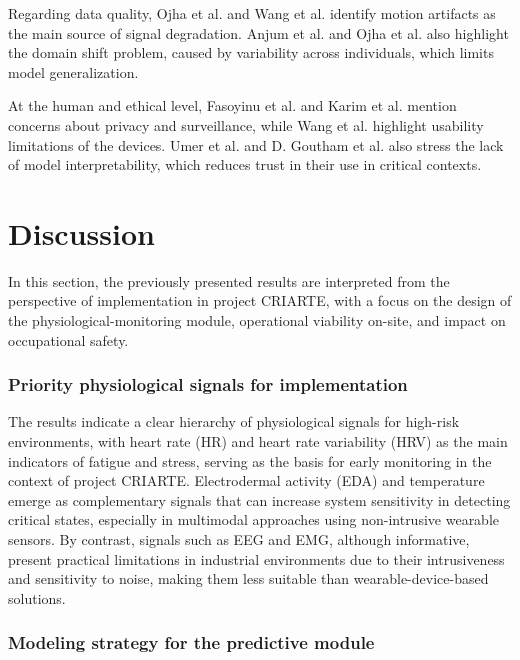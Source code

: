 \documentclass[runningheads]{llncs}
\newcommand{\criarteAcronym}{CRIARTE}
\begin{document}
Regarding data quality, Ojha et al. and Wang et al.\cite{ojha2024,wang2024} identify motion artifacts as the main source of signal degradation. Anjum et al. and Ojha et al.\cite{anjum2025,ojha2024} also highlight the domain shift problem, caused by variability across individuals, which limits model generalization.

At the human and ethical level, Fasoyinu et al. and Karim et al.\cite{fasoyinu2025,karim2025} mention concerns about privacy and surveillance, while Wang et al.\cite{wang2024} highlight usability limitations of the devices. Umer et al. and D. Goutham et al.\cite{umer2025,goutham2025} also stress the lack of model interpretability, which reduces trust in their use in critical contexts.

\section{Discussion}

In this section, the previously presented results are interpreted from the perspective of implementation in project \criarteAcronym, with a focus on the design of the physiological-monitoring module, operational viability on-site, and impact on occupational safety.

\subsubsection*{Priority physiological signals for implementation}

The results indicate a clear hierarchy of physiological signals for high-risk environments, with heart rate (HR) and heart rate variability (HRV) as the main indicators of fatigue and stress, serving as the basis for early monitoring in the context of project \criarteAcronym. Electrodermal activity (EDA) and temperature emerge as complementary signals that can increase system sensitivity in detecting critical states, especially in multimodal approaches using non-intrusive wearable sensors. By contrast, signals such as EEG and EMG, although informative, present practical limitations in industrial environments due to their intrusiveness and sensitivity to noise, making them less suitable than wearable-device-based solutions.

\subsubsection*{Modeling strategy for the predictive module}
\end{document}
